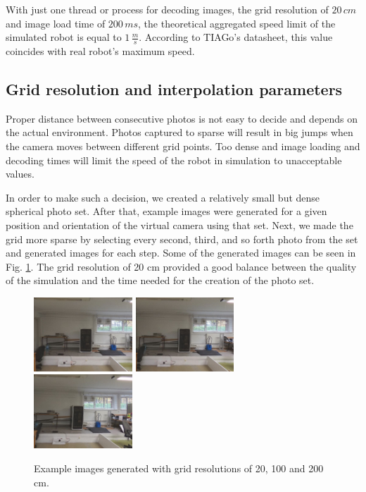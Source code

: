 \documentclass{svproc}
\begin{document}
With just one thread or process for decoding images, the grid resolution of $20\,cm$ and image load time of $200\,ms$, the theoretical aggregated speed limit of the simulated robot is equal to $1\,\frac{m}{s}$.
According to TIAGo's datasheet, this value coincides with real robot's maximum speed.

\subsection{Grid resolution and interpolation parameters}

Proper distance between consecutive photos is not easy to decide and depends on the
actual environment. Photos captured to sparse will result in big jumps when the camera
moves between different grid points. Too dense and image loading and decoding
times will limit the speed of the robot in simulation to unacceptable values.

In order to make such a decision, we created a relatively small but dense spherical photo set.
After that, example images were generated for a given position and orientation of the virtual camera using that set.
Next, we made the grid more sparse by selecting every second, third, and so forth photo from the set and generated images for each step.
Some of the generated images can be seen in Fig. \ref{fig:grid_sizes}.
The grid resolution of 20 cm provided a good balance between the quality of the simulation and the time needed for the creation of the photo set.

\begin{figure}[!ht]
    \centering
    \includegraphics[width=0.33\textwidth]{img/grid_sizes/10}\hfill%
    \includegraphics[width=0.33\textwidth]{img/grid_sizes/50}\hfill%
    \includegraphics[width=0.33\textwidth]{img/grid_sizes/100}\\
    \caption{Example images generated with grid resolutions of 20, 100 and 200 cm.}
    \label{fig:grid_sizes}
\end{figure}\vspace{-10mm}
\end{document}
